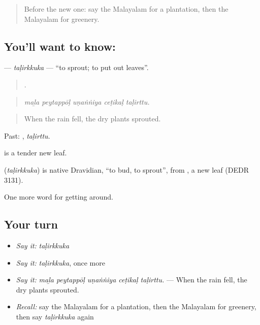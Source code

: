 \label{lesson:ML-C502-talirkkuka}



\begin{quote}
Before the new one: say the Malayalam for a plantation, then the Malayalam for greenery.
\end{quote}

\subsection*{You'll want to know: }
\textbf{} — \emph{taḷirkkuka} — \textquotedblleft{}to sprout; to put out leaves\textquotedblright{}.

\begin{quote}
    .
\end{quote}

\begin{quote}
\emph{maḻa peytappōḷ uṇaṅṅiya ceṭikaḷ taḷirttu.}
\end{quote}

\begin{quote}
When the rain fell, the dry plants sprouted.
\end{quote}

Past: , \emph{taḷirttu}.

 is a tender new leaf.

\begin{cousinweb}
\textbf{} (\emph{taḷirkkuka}) is native Dravidian, \textquotedblleft{}to bud, to sprout\textquotedblright{}, from , a new leaf (DEDR 3131).
\end{cousinweb}

\begin{grammarlens}[title={What you've built}]
One more word for getting around.
\end{grammarlens}

\subsection*{Your turn}
\begin{itemize}
\raggedright
  \item \emph{Say it:} \emph{taḷirkkuka}
  \item \emph{Say it:} \emph{taḷirkkuka}, once more
  \item \emph{Say it:} \emph{maḻa peytappōḷ uṇaṅṅiya ceṭikaḷ taḷirttu.} — When the rain fell, the dry plants sprouted.
  \item \emph{Recall:} say the Malayalam for a plantation, then the Malayalam for greenery, then say \emph{taḷirkkuka} again
\end{itemize}

